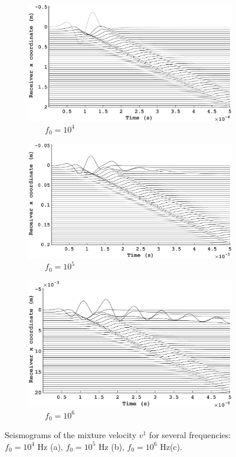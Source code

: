 \documentclass[3p,times,table]{article}
\begin{document}
\begin{figure}[!htbp]
\begin{subfigure}{0.3\linewidth}
\includegraphics[draft=false,width=1\textwidth, 
height=0.15\textheight]{Figures/frec_10_4_new2}
\caption{$\quad\quad f_0=10^{4} $}
\end{subfigure}
\hfill
\begin{subfigure}{0.3\linewidth}
\includegraphics[draft=false,width=1\textwidth, 
height=0.15\textheight]{Figures/frec_10_5_new2}
\caption{$\quad\quad f_0=10^{5} $}
\end{subfigure}%
\hfill
\begin{subfigure}{0.3\linewidth}
\includegraphics[draft=false,width=1\textwidth, 
height=0.15\textheight]{Figures/frec_10_6_new2}
\caption{$\quad\quad f_0=10^{6} $}
\end{subfigure}%
\caption{ Seismograms of the mixture velocity $v^1$ for several frequencies: $f_0=10^{4}$ Hz (a), $f_0=10^{5}$ Hz (b), $f_0=10^{6}$ Hz(c).  }
\label{fig:compare_frewuency_trace}
\end{figure}
\end{document}
